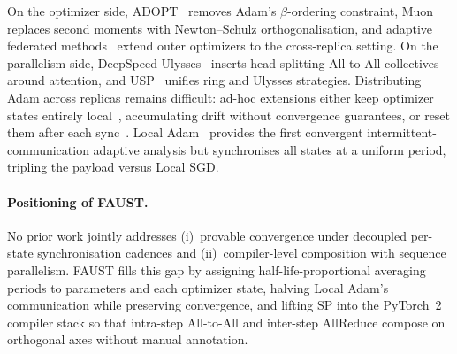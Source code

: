 \documentclass{article}
\begin{document}
On the optimizer side, ADOPT~\citep{taniguchi2024adoptmodifiedadamconverge}
removes Adam's $\beta$-ordering constraint,
Muon~\citep{jordan2024muon,liu2025muonscalablellmtraining} replaces second moments with
Newton--Schulz orthogonalisation, and adaptive federated
methods~\citep{reddi2021adaptivefederatedoptimization,zhuansun2024communicationefficientfederatedlearningadaptive}
extend outer optimizers to the cross-replica setting.
On the parallelism side, DeepSpeed
Ulysses~\citep{jacobs2023deepspeedulyssesoptimizationsenabling} inserts
head-splitting All-to-All collectives around attention, and
USP~\citep{fang2024uspunifiedsequenceparallelism} unifies ring and Ulysses
strategies. Distributing Adam across replicas remains difficult: ad-hoc
extensions either keep optimizer states entirely
local~\citep{douillard2024dilocodistributedlowcommunicationtraining,hilmkil2021scalingfederatedlearningfinetuning,liu2024asynchronouslocalsgdtraininglanguage},
accumulating drift without convergence guarantees, or reset them after each
sync~\citep{sani2024futurelargelanguagemodel,sani2024photonfederatedllmpretraining}.
Local Adam~\citep{cheng2025convergencedistributedadaptiveoptimization} provides
the first convergent intermittent-communication adaptive analysis but synchronises
all states at a uniform period, tripling the payload versus Local SGD.

\paragraph{Positioning of FAUST.}
No prior work jointly addresses (i)~provable convergence under decoupled
per-state synchronisation cadences and (ii)~compiler-level composition with
sequence parallelism. FAUST fills this gap by assigning half-life-proportional
averaging periods to parameters and each optimizer state, halving Local Adam's
communication while preserving convergence, and lifting SP into the PyTorch~2
compiler stack so that intra-step All-to-All and inter-step AllReduce compose on
orthogonal axes without manual annotation.



\end{document}

